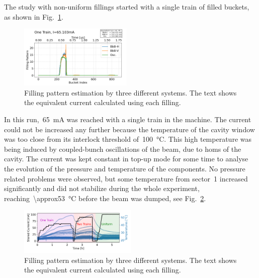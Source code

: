\documentclass
[
    a4paper,
    biblatex,     %
]{jacow}
\begin{document}
    The study with non-uniform fillings started with a single train of filled buckets, as shown in Fig.~\ref{fig:2023-08-01_onetrain_fill}.
    \begin{figure}
        \centering
        \includegraphics[width=0.48\textwidth]{trains1_run3_curr65p103.png}
        \caption{Filling pattern estimation by three different systems. The text shows the equivalent current calculated using each filling.}
        \label{fig:2023-08-01_onetrain_fill}
    \end{figure}
    In this run,~\SI{65}{\milli\ampere} was reached with a single train in the machine. The current could not be increased any further because the temperature of the cavity window was too close from its interlock threshold of~\SI{100}{\celsius}. This high temperature was being induced by coupled-bunch oscillations of the beam, due to \glspl{hom} of the cavity. The current was kept constant in top-up mode for some time to analyse the evolution of the pressure and temperature of the components. No pressure related problems were observed, but some temperature from sector~\num{1} increased significantly and did not stabilize during the whole experiment, reaching~\SI{\approx53}{\celsius} before the beam was dumped, see Fig.~\ref{fig:temps_sector1}.
        \begin{figure}
        \centering
        \includegraphics[width=0.5\textwidth]{temps_sector1.png}
        \caption{Filling pattern estimation by three different systems. The text shows the equivalent current calculated using each filling.}
        \label{fig:temps_sector1}
    \end{figure}
\end{document}
